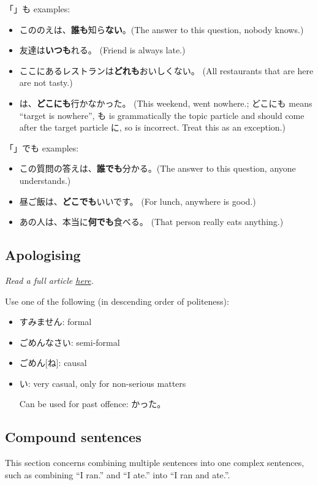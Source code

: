 \documentclass[../nihongo-gakushuu-kyouzai-grammar.tex]{subfiles}
\begin{document}
「」も examples:
\begin{itemize}
    \item こののえは、\textbf{誰も}知ら\textbf{ない}。(The answer to this question, nobody knows.)
    \item 友達は\textbf{いつも}れる。 (Friend is always late.)
    \item ここにあるレストランは\textbf{どれも}おいしくない。 (All restaurants that are here are not tasty.)
    \item {}は、\textbf{どこにも}行かなかった。 (This weekend, went nowhere.; どこにも means ``target is nowhere'', も is grammatically the topic particle and should come after the target particle に, so  is incorrect. Treat this as an exception.)
\end{itemize}

「」でも examples:
\begin{itemize}
    \item この質問の答えは、\textbf{誰でも}分かる。(The answer to this question, anyone understands.)
    \item 昼ご飯は、\textbf{どこでも}いいです。 (For lunch, anywhere is good.)
    \item あの人は、本当に\textbf{何でも}食べる。 (That person really eats anything.)
\end{itemize}

\subsection{Apologising}
\emph{Read a full article \href{https://www.clozemaster.com/blog/sorry-in-japanese/}{here}.}

Use one of the following (in descending order of politeness):
\begin{itemize}
    \item すみません: formal
    \item ごめんなさい: semi-formal
    \item ごめん[ね]: causal
    \item {}い: very casual, only for non-serious matters

    Can be used for past offence: かった。
\end{itemize}


\subsection{Compound sentences}
This section concerns combining multiple sentences into one complex sentences, such as combining ``I ran.'' and ``I ate.'' into ``I ran and ate.''.
\end{document}
